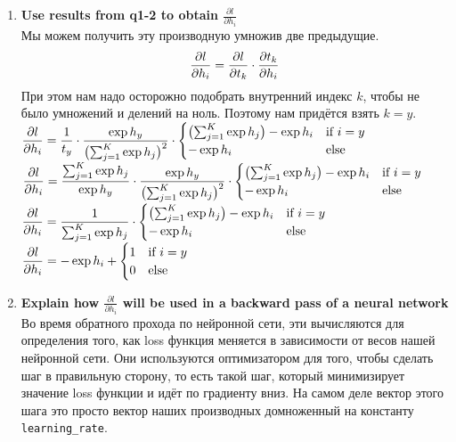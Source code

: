 \documentclass{article}
\begin{document}
{\begin{enumerate}
    \item \textbf{Use results from q1-2 to obtain $\frac{\partial l}{\partial h_i}$} \\
      Мы можем получить эту производную умножив две предыдущие.
      $$ \frac{\partial l}{\partial h_i} = \frac{\partial l}{\partial t_k} \cdot \frac{\partial t_k}{\partial h_i}$$
      При этом нам надо осторожно подобрать внутренний индекс $k$, чтобы не было умножений и делений на ноль.
      Поэтому нам придётся взять $k=y$. \vspace{0.5em} \\
      $\displaystyle \frac{\partial l}{\partial h_i} = \frac{1}{t_y} \cdot \frac{\exp{h_y}}{\bigl(\sum_{j=1}^K \exp{h_j}\bigr)^2} \cdot \begin{cases}
        \bigl(\sum_{j=1}^K \exp{h_j}\bigr) - \exp{h_i} & \text{if } i = y \\
        -\exp{h_i} & \text{else}\\
      \end{cases}$ \vspace{0.5em} \\
      $\displaystyle \frac{\partial l}{\partial h_i} = \frac{\sum_{j=1}^K \exp{h_j}}{\exp{h_y}} \cdot \frac{\exp{h_y}}{\bigl(\sum_{j=1}^K \exp{h_j}\bigr)^2} \cdot \begin{cases}
        \bigl(\sum_{j=1}^K \exp{h_j}\bigr) - \exp{h_i} & \text{if } i = y \\
        -\exp{h_i} & \text{else}\\
      \end{cases}$ \vspace{0.5em} \\
      $\displaystyle \frac{\partial l}{\partial h_i} = \frac{1}{\sum_{j=1}^K \exp{h_j}} \cdot \begin{cases}
        \bigl(\sum_{j=1}^K \exp{h_j}\bigr) - \exp{h_i} & \text{if } i = y \\
        -\exp{h_i} & \text{else}\\
      \end{cases}$ \vspace{0.5em} \\
      $\displaystyle \frac{\partial l}{\partial h_i} = -\exp{h_i} + \begin{cases}
        1 & \text{if } i = y \\
        0 & \text{else}\\
      \end{cases}$

    \item \textbf{Explain how $\frac{\partial l}{\partial h_i}$ will be used in a backward pass of a neural network} \\
      Во время обратного прохода по нейронной сети, эти вычисляются для определения того,
      как loss функция меняется в зависимости от весов нашей нейронной сети.
      Они используются оптимизатором для того, чтобы сделать шаг в правильную сторону,
      то есть такой шаг, который минимизирует значение loss функции и идёт по градиенту вниз.
      На самом деле вектор этого шага это просто вектор наших производных домноженный на константу \texttt{learning\_rate}.
  \end{enumerate}
}
\end{document}
